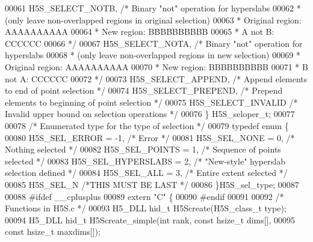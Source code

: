 \begin{DoxyCode}
00061     H5S\_SELECT\_NOTB,            \textcolor{comment}{/* Binary "not" operation for hyperslabs}
00062 \textcolor{comment}{                                 * (only leave non-overlapped regions in original selection)}
00063 \textcolor{comment}{                                 * Original region:  AAAAAAAAAA}
00064 \textcolor{comment}{                                 * New region:             BBBBBBBBBB}
00065 \textcolor{comment}{                                 * A not B:          CCCCCC}
00066 \textcolor{comment}{                                 */}
00067     H5S\_SELECT\_NOTA,            \textcolor{comment}{/* Binary "not" operation for hyperslabs}
00068 \textcolor{comment}{                                 * (only leave non-overlapped regions in new selection)}
00069 \textcolor{comment}{                                 * Original region:  AAAAAAAAAA}
00070 \textcolor{comment}{                                 * New region:             BBBBBBBBBB}
00071 \textcolor{comment}{                                 * B not A:                    CCCCCC}
00072 \textcolor{comment}{                                 */}
00073     H5S\_SELECT\_APPEND,          \textcolor{comment}{/* Append elements to end of point selection */}
00074     H5S\_SELECT\_PREPEND,         \textcolor{comment}{/* Prepend elements to beginning of point selection */}
00075     H5S\_SELECT\_INVALID          \textcolor{comment}{/* Invalid upper bound on selection operations */}
00076 \} H5S\_seloper\_t;
00077 
00078 \textcolor{comment}{/* Enumerated type for the type of selection */}
00079 \textcolor{keyword}{typedef} \textcolor{keyword}{enum} \{
00080     H5S\_SEL\_ERROR   = -1,   \textcolor{comment}{/* Error            */}
00081     H5S\_SEL\_NONE    = 0,    \textcolor{comment}{/* Nothing selected         */}
00082     H5S\_SEL\_POINTS  = 1,    \textcolor{comment}{/* Sequence of points selected  */}
00083     H5S\_SEL\_HYPERSLABS  = 2,    \textcolor{comment}{/* "New-style" hyperslab selection defined  */}
00084     H5S\_SEL\_ALL     = 3,    \textcolor{comment}{/* Entire extent selected   */}
00085     H5S\_SEL\_N           \textcolor{comment}{/*THIS MUST BE LAST     */}
00086 \}H5S\_sel\_type;
00087 
00088 \textcolor{preprocessor}{#ifdef \_\_cplusplus}
00089 \textcolor{keyword}{extern} \textcolor{stringliteral}{"C"} \{
00090 \textcolor{preprocessor}{#endif}
00091 
00092 \textcolor{comment}{/* Functions in H5S.c */}
00093 H5\_DLL hid\_t H5Screate(H5S\_class\_t type);
00094 H5\_DLL hid\_t H5Screate\_simple(\textcolor{keywordtype}{int} rank, \textcolor{keyword}{const} hsize\_t dims[],
00095                    \textcolor{keyword}{const} hsize\_t maxdims[]);

\end{DoxyCode}
